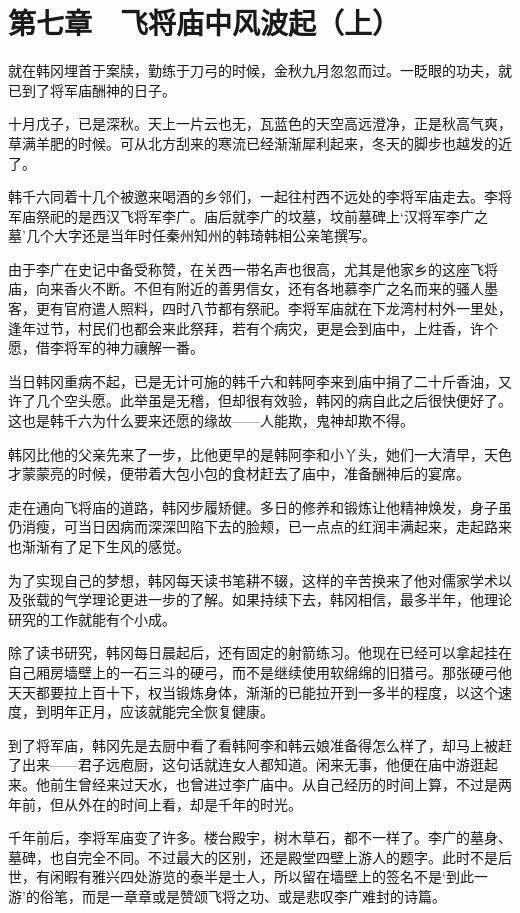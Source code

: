 \section{第七章　飞将庙中风波起（上）}

就在韩冈埋首于案牍，勤练于刀弓的时候，金秋九月忽忽而过。一眨眼的功夫，就已到了将军庙酬神的日子。

十月戊子，已是深秋。天上一片云也无，瓦蓝色的天空高远澄净，正是秋高气爽，草满羊肥的时候。可从北方刮来的寒流已经渐渐犀利起来，冬天的脚步也越发的近了。

韩千六同着十几个被邀来喝酒的乡邻们，一起往村西不远处的李将军庙走去。李将军庙祭祀的是西汉飞将军李广。庙后就李广的坟墓，坟前墓碑上‘汉将军李广之墓’几个大字还是当年时任秦州知州的韩琦韩相公亲笔撰写。

由于李广在史记中备受称赞，在关西一带名声也很高，尤其是他家乡的这座飞将庙，向来香火不断。不但有附近的善男信女，还有各地慕李广之名而来的骚人墨客，更有官府遣人照料，四时八节都有祭祀。李将军庙就在下龙湾村村外一里处，逢年过节，村民们也都会来此祭拜，若有个病灾，更是会到庙中，上炷香，许个愿，借李将军的神力禳解一番。

当日韩冈重病不起，已是无计可施的韩千六和韩阿李来到庙中捐了二十斤香油，又许了几个空头愿。此举虽是无稽，但却很有效验，韩冈的病自此之后很快便好了。这也是韩千六为什么要来还愿的缘故——人能欺，鬼神却欺不得。

韩冈比他的父亲先来了一步，比他更早的是韩阿李和小丫头，她们一大清早，天色才蒙蒙亮的时候，便带着大包小包的食材赶去了庙中，准备酬神后的宴席。

走在通向飞将庙的道路，韩冈步履矫健。多日的修养和锻炼让他精神焕发，身子虽仍消瘦，可当日因病而深深凹陷下去的脸颊，已一点点的红润丰满起来，走起路来也渐渐有了足下生风的感觉。

为了实现自己的梦想，韩冈每天读书笔耕不辍，这样的辛苦换来了他对儒家学术以及张载的气学理论更进一步的了解。如果持续下去，韩冈相信，最多半年，他理论研究的工作就能有个小成。

除了读书研究，韩冈每日晨起后，还有固定的射箭练习。他现在已经可以拿起挂在自己厢房墙壁上的一石三斗的硬弓，而不是继续使用软绵绵的旧猎弓。那张硬弓他天天都要拉上百十下，权当锻炼身体，渐渐的已能拉开到一多半的程度，以这个速度，到明年正月，应该就能完全恢复健康。

到了将军庙，韩冈先是去厨中看了看韩阿李和韩云娘准备得怎么样了，却马上被赶了出来——君子远庖厨，这句话就连女人都知道。闲来无事，他便在庙中游逛起来。他前生曾经来过天水，也曾进过李广庙中。从自己经历的时间上算，不过是两年前，但从外在的时间上看，却是千年的时光。

千年前后，李将军庙变了许多。楼台殿宇，树木草石，都不一样了。李广的墓身、墓碑，也自完全不同。不过最大的区别，还是殿堂四壁上游人的题字。此时不是后世，有闲暇有雅兴四处游览的泰半是士人，所以留在墙壁上的签名不是‘到此一游’的俗笔，而是一章章或是赞颂飞将之功、或是悲叹李广难封的诗篇。

